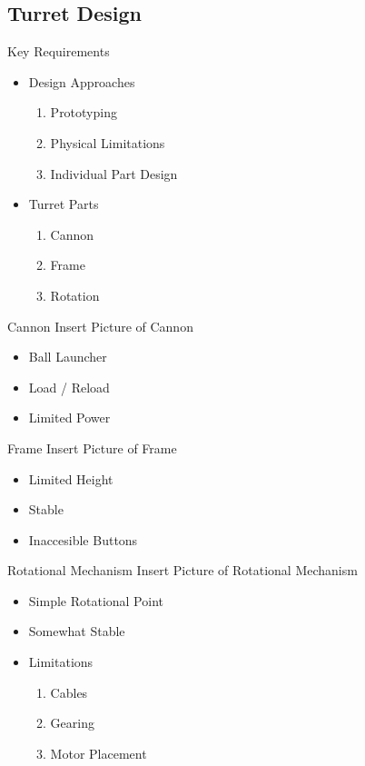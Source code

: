 \subsection{Turret Design}
\begin{frame}{Key Requirements}
\begin{itemize}
    \item Design Approaches
		\begin{enumerate}
  			\item Prototyping
  			\item Physical Limitations
  			\item Individual Part Design
		\end{enumerate} 
	\item Turret Parts
		\begin{enumerate}
  			\item Cannon
  			\item Frame
  			\item Rotation
		\end{enumerate}
\end{itemize}
\end{frame}

\begin{frame}{Cannon}
Insert Picture of Cannon
\begin{itemize}
	\item Ball Launcher
	\item Load / Reload
	\item Limited Power
\end{itemize}
\end{frame}

\begin{frame}{Frame}
Insert Picture of Frame
\begin{itemize}
	\item Limited Height
	\item Stable
	\item Inaccesible Buttons
\end{itemize}
\end{frame}

\begin{frame}{Rotational Mechanism}
Insert Picture of Rotational Mechanism
\begin{itemize}
    \item Simple Rotational Point 
	\item Somewhat Stable
	\item Limitations
		\begin{enumerate}
  			\item Cables
  			\item Gearing
  			\item Motor Placement
		\end{enumerate}
\end{itemize}
\end{frame}

